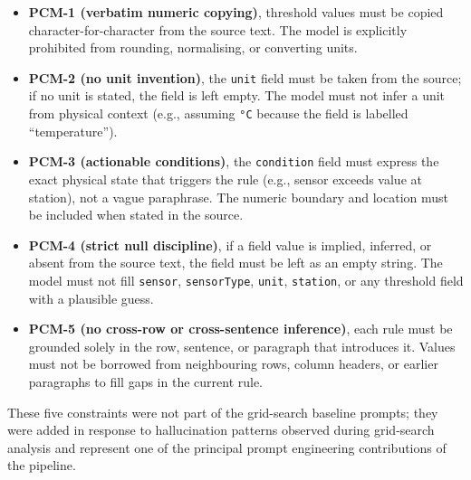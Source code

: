 ﻿\documentclass[11pt]{article}
\begin{document}
\begin{itemize}
    \item \textbf{PCM-1 (verbatim numeric copying)}, threshold values must be
          copied character-for-character from the source text.  The model is
          explicitly prohibited from rounding, normalising, or converting units.
    \item \textbf{PCM-2 (no unit invention)}, the \texttt{unit} field must be
          taken from the source; if no unit is stated, the field is left empty.
          The model must not infer a unit from physical context (e.g., assuming
          \texttt{°C} because the field is labelled ``temperature'').
    \item \textbf{PCM-3 (actionable conditions)}, the \texttt{condition} field must
          express the exact physical state that triggers the rule (e.g., sensor
          exceeds value at station), not a vague paraphrase.  The numeric boundary
          and location must be included when stated in the source.
    \item \textbf{PCM-4 (strict null discipline)}, if a field value is implied,
          inferred, or absent from the source text, the field must be left as an
          empty string.  The model must not fill \texttt{sensor}, \texttt{sensorType},
          \texttt{unit}, \texttt{station}, or any threshold field with a plausible
          guess.
    \item \textbf{PCM-5 (no cross-row or cross-sentence inference)}, each rule must
          be grounded solely in the row, sentence, or paragraph that introduces it.
          Values must not be borrowed from neighbouring rows, column headers, or
          earlier paragraphs to fill gaps in the current rule.
\end{itemize}

These five constraints were not part of the grid-search baseline prompts; they were
added in response to hallucination patterns observed during grid-search analysis and
represent one of the principal prompt engineering contributions of the pipeline.
\end{document}
